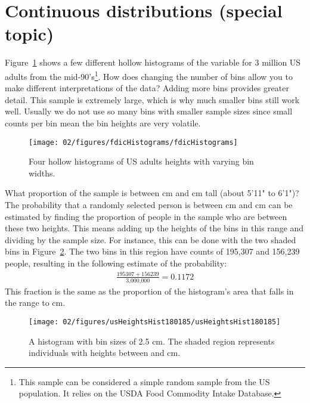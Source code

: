 \section{Continuous distributions (special topic)}
\label{contDist}

\begin{example}{Figure~\ref{fdicHistograms} shows a few different hollow histograms of the variable  for 3 million US adults from the mid-90's\footnote{This sample can be considered a simple random sample from the US population. It relies on the USDA Food Commodity Intake Database.}. How does changing the number of bins allow you to make different interpretations of the data?}\label{usHeights}
Adding more bins provides greater detail. This sample is extremely large, which is why much smaller bins still work well. Usually we do not use so many bins with smaller sample sizes since small counts per bin mean the bin heights are very volatile.
\end{example}
\begin{figure}[ht]
\centering
\texttt{[image: 02/figures/fdicHistograms/fdicHistograms]}
\caption{Four hollow histograms of US adults heights with varying bin widths.}
\label{fdicHistograms}
\end{figure}

\begin{example}{What proportion of the sample is between  cm and  cm tall (about 5'11" to 6'1")?}\label{contDistProb}
The probability that a randomly selected person is between  cm and  cm can be estimated by finding the proportion of people in the sample who are between these two heights. This means adding up the heights of the bins in this range and dividing by the sample size. For instance, this can be done with the two shaded bins in Figure~\ref{usHeightsHist180185}. The two bins in this region have counts of 195,307 and 156,239 people, resulting in the following estimate of the probability:
\begin{eqnarray*}
\frac{195307+156239}{\text{3,000,000}} = 0.1172
\end{eqnarray*}
This fraction is the same as the proportion of the histogram's area that falls in the range  to  cm. %
\end{example}
\begin{figure}
\centering
\texttt{[image: 02/figures/usHeightsHist180185/usHeightsHist180185]}
\caption{A histogram with bin sizes of 2.5 cm. The shaded region represents individuals with heights between  and  cm. }
\label{usHeightsHist180185}
\end{figure}


